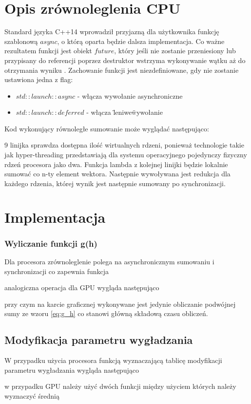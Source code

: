 \section{Opis zrównoleglenia CPU}
\label{sec:opis_cpu}
Standard języka C++14 wprowadził przyjazną dla użytkownika funkcję szablonową $async$, o którą oparta będzie dalsza implementacja. Co ważne rezultatem funkcji jest obiekt $future$, który jeśli nie zostanie przeniesiony lub przypisany do referencji poprzez destruktor wstrzyma wykonywanie wątku aż do otrzymania wyniku \cite{CppRefAsync}. Zachowanie funkcji jest niezdefiniowane, gdy nie zostanie ustawiona jedna z flag:
\begin{itemize}
\item $std::launch::async$ - włącza wywołanie asynchroniczne
\item $std::launch::deferred$ - włącza \"leniwe\" wywołanie
\end{itemize}
Kod wykonujący równoległe sumowanie może wyglądać następująco:

9 linijka sprawdza dostępna ilość wirtualnych rdzeni, ponieważ technologie takie jak hyper-threading przedstawiają dla systemu operacyjnego pojedynczy fizyczny rdzeń procesora jako dwa. Funkcja lambda z kolejnej linijki będzie lokalnie sumować co n-ty element wektora. Następnie wywoływana jest redukcja dla każdego rdzenia, której wynik jest następnie sumowany po synchronizacji.

\section{Implementacja}
\label{sec:implementacja}

\subsubsection{Wyliczanie funkcji g(h)}
Dla procesora zrównoleglenie polega na asynchronicznym sumowaniu i synchronizacji co zapewnia funkcja

analogiczna operacja dla GPU wygląda następująco

przy czym na karcie graficznej wykonywane jest jedynie obliczanie podwójnej sumy ze wzoru \eqref{eq:g_h} co stanowi główną składową czasu obliczeń.

\subsection{Modyfikacja parametru wygładzania}
W przypadku użycia procesora funkcją wyznaczającą tablicę modyfikacji parametru wygładzania wygląda następująco

w przypadku GPU należy użyć dwóch funkcji między użyciem których należy wyznaczyć średnią


